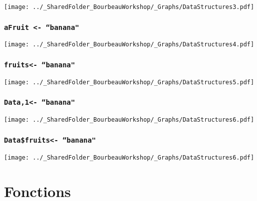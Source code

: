 \documentclass{beamer}
\begin{document}
    \begin{frame}
        \frametitle{} \vspace{0.7cm}
        \begin{center}
            \texttt{[image: ../\_SharedFolder\_BourbeauWorkshop/\_Graphs/DataStructures3.pdf]}
        \end{center}
    \end{frame}

    \begin{frame}
        \frametitle{\texttt{aFruit <- ``banana"}} \vspace{0.6cm}
        \begin{center}
            \texttt{[image: ../\_SharedFolder\_BourbeauWorkshop/\_Graphs/DataStructures4.pdf]}
        \end{center}
    \end{frame}

    \begin{frame}
        \frametitle{\texttt{fruits\rbrack <- ``banana"}} \vspace{0.6cm}
        \begin{center}
            \texttt{[image: ../\_SharedFolder\_BourbeauWorkshop/\_Graphs/DataStructures5.pdf]}
        \end{center}
    \end{frame}

    \begin{frame}
        \frametitle{\texttt{Data,1\rbrack  <- ``banana"}} \vspace{0.6cm}
        \begin{center}
            \texttt{[image: ../\_SharedFolder\_BourbeauWorkshop/\_Graphs/DataStructures6.pdf]}
        \end{center}
    \end{frame}
    
    \begin{frame}
        \frametitle{\texttt{Data\$fruits\rbrack <- ``banana"}} \vspace{0.6cm}
        \begin{center}
            \texttt{[image: ../\_SharedFolder\_BourbeauWorkshop/\_Graphs/DataStructures6.pdf]}
        \end{center}
    \end{frame}




\section{Fonctions}
\end{document}
